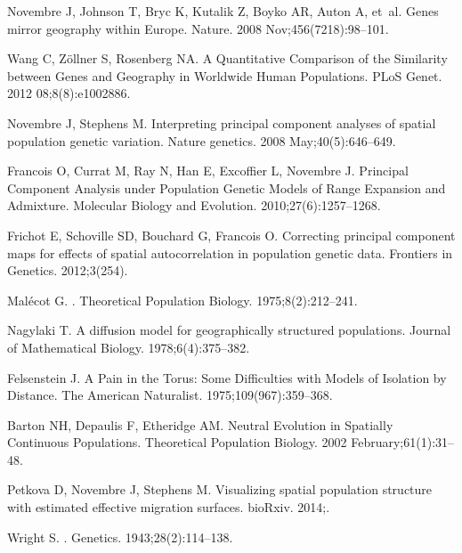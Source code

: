 \documentclass[10pt,letterpaper]{article}
\begin{document}
\begin{thebibliography}{80}
Novembre J, Johnson T, Bryc K, Kutalik Z, Boyko AR, Auton A, et~al.
\newblock Genes mirror geography within {Europe}.
\newblock Nature. 2008 Nov;456(7218):98--101.

Wang C, Zöllner S, Rosenberg NA.
\newblock A Quantitative Comparison of the Similarity between Genes and
  Geography in Worldwide Human Populations.
\newblock PLoS Genet. 2012 08;8(8):e1002886.

Novembre J, Stephens M.
\newblock Interpreting principal component analyses of spatial population
  genetic variation.
\newblock Nature genetics. 2008 May;40(5):646--649.

Francois O, Currat M, Ray N, Han E, Excoffier L, Novembre J.
\newblock Principal Component Analysis under Population Genetic Models of Range
  Expansion and Admixture.
\newblock Molecular Biology and Evolution. 2010;27(6):1257--1268.

Frichot E, Schoville SD, Bouchard G, Francois O.
\newblock Correcting principal component maps for effects of spatial
  autocorrelation in population genetic data.
\newblock Frontiers in Genetics. 2012;3(254).

Mal\'{e}cot G.
.
\newblock Theoretical Population Biology. 1975;8(2):212--241.

Nagylaki T.
\newblock A diffusion model for geographically structured populations.
\newblock Journal of Mathematical Biology. 1978;6(4):375--382.

Felsenstein J.
\newblock A Pain in the Torus: Some Difficulties with Models of Isolation by
  Distance.
\newblock The American Naturalist. 1975;109(967):359--368.

Barton NH, Depaulis F, Etheridge AM.
\newblock Neutral Evolution in Spatially Continuous Populations.
\newblock Theoretical Population Biology. 2002 February;61(1):31--48.

Petkova D, Novembre J, Stephens M.
\newblock Visualizing spatial population structure with estimated effective
  migration surfaces.
\newblock bioRxiv. 2014;.

Wright S.
.
\newblock Genetics. 1943;28(2):114--138.


\end{thebibliography}
\end{document}
